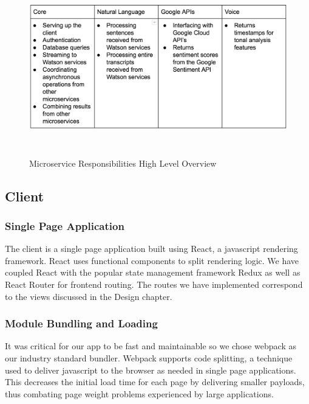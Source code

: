 \begin{figure}[H]
  \centering
   \includegraphics[height=3.0in]{figures/microservice_separation}
   \caption{Microservice Responsibilities High Level Overview}
\end{figure}

\subsection*{Client}

\subsubsection*{Single Page Application}

The client is a single page application built using React, a javascript
rendering framework. React uses functional components to split rendering logic.
We have coupled React with the popular state management framework Redux as well
as React Router for frontend routing. The routes we have implemented correspond
to the views discussed in the Design chapter.

\subsubsection*{Module Bundling and Loading}

It was critical for our app to be fast and maintainable so we chose webpack as
our industry standard bundler. Webpack supports code splitting, a technique used
to deliver javascript to the browser as needed in single page applications. This
decreases the initial load time for each page by delivering smaller payloads,
thus combating page weight problems experienced by large applications.

